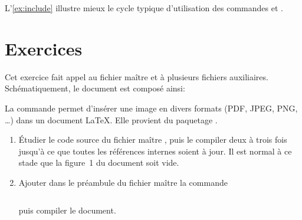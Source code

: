 L'\autoref{ex:include} illustre mieux le cycle typique
d'utilisation des commandes \cmd{} et \cmd{}.




\section{Exercices}
\label{sec:include:exercices}


\begin{exercice}
  \label{ex:include}
  Cet exercice fait appel au fichier maître
   et à plusieurs fichiers auxiliaires.
  Schématiquement, le document est composé ainsi:

  \medskip
  \begin{minipage}{\linewidth}
  \end{minipage}
  \medskip

  La commande  permet d'insérer une image
  en divers formats (PDF, JPEG, PNG, \dots) dans un document {\LaTeX}.
  Elle provient du paquetage .

  \begin{enumerate}
  \item Étudier le code source du fichier maître
    , puis le compiler deux à trois
    fois jusqu'à ce que toutes les références internes soient à jour.
    Il est normal à ce stade que la figure~1 du document soit vide.
  \item Ajouter dans le préambule du fichier maître la commande
\begin{lstlisting}

\end{lstlisting}
    puis compiler le document.


\end{enumerate}
\end{exercice}
